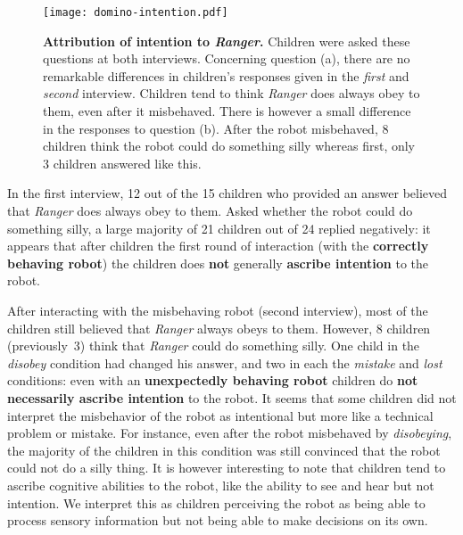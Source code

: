 \documentclass[letterpaper, 10pt, conference]{ieeeconf}
\begin{document}
\begin{figure}[h]
    \centering
    \texttt{[image: domino-intention.pdf]}
    \caption{\small \textbf{Attribution of intention to \emph{Ranger}.} Children were
        asked these questions at both interviews. Concerning question (a), there
        are no remarkable differences in children's responses given in the
        \textit{first} and \textit{second} interview.  Children tend to think
        \emph{Ranger} does always obey to them, even after it misbehaved. There is
        however a small difference in the responses to question (b).  After the
        robot misbehaved, 8 children think the robot could do something silly whereas
        first, only 3 children answered like this.}
    
    \label{fig:domino-intention}

\end{figure}


In the first interview, 12 out of the 15 children who provided an answer
believed that \emph{Ranger} does always obey to them. Asked whether the robot
could do something silly, a large majority of 21 children out of 24 replied
negatively: it appears that after children the first round of interaction (with
the \textbf{correctly behaving robot}) the children does \textbf{not} generally
\textbf{ascribe intention} to the robot.

After interacting with the misbehaving robot (second interview), most of the
children still believed that \emph{Ranger} always obeys to them.  However, 8
children (previously~3) think that \emph{Ranger} could do something silly. One
child in the \textit{disobey} condition had changed his answer, and two in each
the \textit{mistake} and \textit{lost} conditions: even with an
\textbf{unexpectedly behaving robot} children do \textbf{not necessarily ascribe
intention} to the robot.  It seems that some children did not interpret the
misbehavior of the robot as intentional but more like a technical problem or
mistake. For instance, even after the robot misbehaved by \textit{disobeying},
the majority of the children in this condition was still convinced that the
robot could not do a silly thing.  It is however interesting to note that
children tend to ascribe cognitive abilities to the robot, like the ability to
see and hear but not intention. We interpret this as children perceiving the
robot as being able to process sensory information but not being able to make
decisions on its own.
\end{document}

